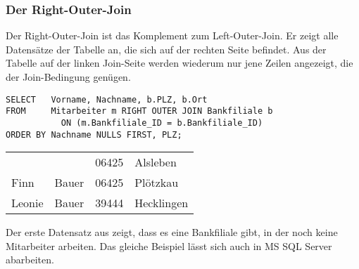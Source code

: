         \subsubsection{Der Right-Outer-Join}
          Der Right-Outer-Join ist das Komplement zum Left-Outer-Join. Er zeigt alle Datensätze der Tabelle an, die sich auf der rechten Seite befindet. Aus der Tabelle auf der linken Join-Seite werden wiederum nur jene Zeilen angezeigt, die der Join-Bedingung genügen.
          \begin{lstlisting}[language=oracle_sql,caption={Ein Right-Outer-Join in Oracle},label=sql04_15]
SELECT   Vorname, Nachname, b.PLZ, b.Ort
FROM     Mitarbeiter m RIGHT OUTER JOIN Bankfiliale b
           ON (m.Bankfiliale_ID = b.Bankfiliale_ID)
ORDER BY Nachname NULLS FIRST, PLZ;
          \end{lstlisting}
          \begin{center}
            \begin{small}
              \tablehead{}
              \tabletail {
              }
              \begin{oraclesql}
                \begin{supertabular}{llll}
                &  & 06425 & Alsleben \\
                Finn & Bauer & 06425 & Plötzkau \\
                Leonie & Bauer & 39444 & Hecklingen \\
                \end{supertabular}
              \end{oraclesql}
            \end{small}
          \end{center}
          Der erste Datensatz aus  zeigt, dass es eine Bankfiliale gibt, in der noch keine Mitarbeiter arbeiten. Das gleiche Beispiel lässt sich auch  in MS SQL Server abarbeiten.
